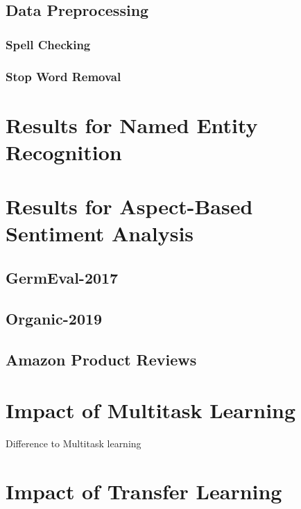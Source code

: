 \subsection{Data Preprocessing}
\label{subsec:06_dataPreprocessing}

\subsubsection{Spell Checking}

\subsubsection{Stop Word Removal}


\section{Results for Named Entity Recognition}

\section{Results for Aspect-Based Sentiment Analysis}

\subsection{GermEval-2017}

\subsection{Organic-2019}

\subsection{Amazon Product Reviews}

\section{Impact of Multitask Learning}
Difference to Multitask learning



\section{Impact of Transfer Learning}

